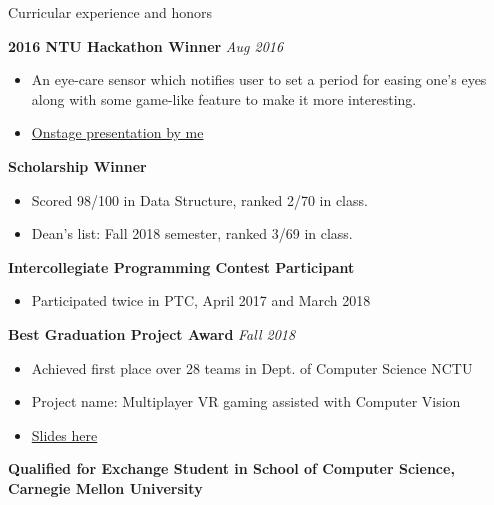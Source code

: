 \documentclass{resume} %
\begin{document}
\begin{rSection}{Curricular experience and honors}

{\bf 2016 NTU Hackathon Winner} \hfill {\em Aug 2016}
\begin{itemize}
    \item An eye-care sensor which notifies user to set a period for easing one's eyes along with some game-like feature to make it more interesting.
    \item \href{https://www.youtube.com/watch?v=LerD1-Vispg}{Onstage presentation by me}
\end{itemize}

{\bf Scholarship Winner} \hfill {\em}
\begin{itemize}
    \item Scored 98/100 in Data Structure, ranked 2/70 in class.
    \item Dean's list: Fall 2018 semester, ranked 3/69 in class.
\end{itemize}

{\bf Intercollegiate Programming Contest Participant}
\begin{itemize}
    \item Participated twice in PTC, April 2017 and March 2018
\end{itemize}

{\bf Best Graduation Project Award} \hfill {\em Fall 2018}
\begin{itemize}
    \item Achieved first place over 28 teams in Dept. of Computer Science NCTU
    \item Project name: Multiplayer VR gaming assisted with Computer Vision
    \item \href{https://github.com/kai0122/NCTU-CS-Graduation-Project?fbclid=IwAR3DxQrgYiWn7BxJb9AZVgITAuv5XSOHrdM8DTjRmwvZTLSyk_Wg-JlftW0}{Slides here} 
\end{itemize}

{\bf Qualified for Exchange Student in School of Computer Science, Carnegie Mellon University}
\end{rSection}
\end{document}

